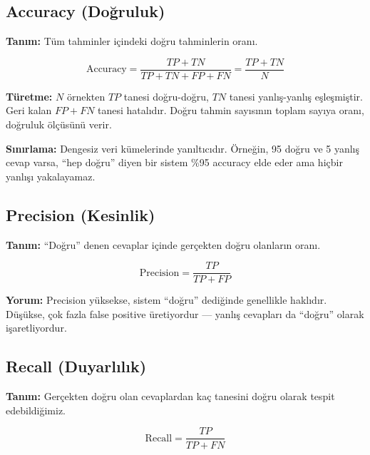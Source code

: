 \subsection{Accuracy (Do\u{g}ruluk)}

\textbf{Tan{\i}m:} T\"{u}m tahminler i\c{c}indeki do\u{g}ru tahminlerin oran{\i}.

\begin{equation}
\label{eq:accuracy}
\boxed{\text{Accuracy} = \frac{TP + TN}{TP + TN + FP + FN} = \frac{TP + TN}{N}}
\end{equation}

\textbf{T\"{u}retme:} $N$ \"{o}rnekten $TP$ tanesi do\u{g}ru-do\u{g}ru, $TN$ tanesi yanl{\i}\c{s}-yanl{\i}\c{s} e\c{s}le\c{s}mi\c{s}tir. Geri kalan $FP + FN$ tanesi hatal{\i}d{\i}r. Do\u{g}ru tahmin say{\i}s{\i}n{\i}n toplam say{\i}ya oran{\i}, do\u{g}ruluk \"{o}l\c{c}\"{u}s\"{u}n\"{u} verir.

\textbf{S{\i}n{\i}rlama:} Dengesiz veri k\"{u}melerinde yan{\i}lt{\i}c{\i}d{\i}r. \"{O}rne\u{g}in, 95 do\u{g}ru ve 5 yanl{\i}\c{s} cevap varsa, ``hep do\u{g}ru'' diyen bir sistem \%95 accuracy elde eder ama hi\c{c}bir yanl{\i}\c{s}{\i} yakalayamaz.

\subsection{Precision (Kesinlik)}

\textbf{Tan{\i}m:} ``Do\u{g}ru'' denen cevaplar i\c{c}inde ger\c{c}ekten do\u{g}ru olanlar{\i}n oran{\i}.

\begin{equation}
\label{eq:precision}
\boxed{\text{Precision} = \frac{TP}{TP + FP}}
\end{equation}

\textbf{Yorum:} Precision y\"{u}ksekse, sistem ``do\u{g}ru'' dedi\u{g}inde genellikle hakl{\i}d{\i}r. D\"{u}\c{s}\"{u}kse, \c{c}ok fazla false positive \"{u}retiyordur --- yanl{\i}\c{s} cevaplar{\i} da ``do\u{g}ru'' olarak i\c{s}aretliyordur.

\subsection{Recall (Duyarl{\i}l{\i}k)}

\textbf{Tan{\i}m:} Ger\c{c}ekten do\u{g}ru olan cevaplardan ka\c{c} tanesini do\u{g}ru olarak tespit edebildi\u{g}imiz.

\begin{equation}
\label{eq:recall}
\boxed{\text{Recall} = \frac{TP}{TP + FN}}
\end{equation}

